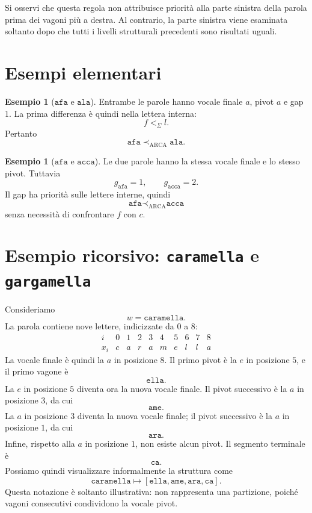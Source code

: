 \documentclass[11pt,a4paper]{article}
\theoremstyle{definition}
\newtheorem{esempio}[teorema]{Esempio}
\theoremstyle{remark}
\newcommand{\ARCA}{\mathrm{ARCA}}
\newcommand{\precA}{\prec_{\ARCA}}
\begin{document}
Si osservi che questa regola non attribuisce priorità alla parte sinistra della parola prima dei vagoni più a destra. Al contrario, la parte sinistra viene esaminata soltanto dopo che tutti i livelli strutturali precedenti sono risultati uguali.

\section{Esempi elementari}

\begin{esempio}[$\texttt{afa}$ e $\texttt{ala}$]
Entrambe le parole hanno vocale finale $a$, pivot $a$ e gap $1$. La prima differenza è quindi nella lettera interna:
\[
  f<_{\Sigma}l.
\]
Pertanto
\[
  \texttt{afa}\precA\texttt{ala}.
\]
\end{esempio}

\begin{esempio}[$\texttt{afa}$ e $\texttt{acca}$]
Le due parole hanno la stessa vocale finale e lo stesso pivot. Tuttavia
\[
  g_{\texttt{afa}}=1,\qquad g_{\texttt{acca}}=2.
\]
Il gap ha priorità sulle lettere interne, quindi
\[
  \texttt{afa}\precA\texttt{acca}
\]
senza necessità di confrontare $f$ con $c$.
\end{esempio}

\section{Esempio ricorsivo: \texttt{caramella} e \texttt{gargamella}}

Consideriamo
\[
  w=\texttt{caramella}.
\]
La parola contiene nove lettere, indicizzate da $0$ a $8$:
\[
\begin{array}{c|ccccccccc}
 i   &0&1&2&3&4&5&6&7&8\\
\hline
 x_i &c&a&r&a&m&e&l&l&a
\end{array}
\]
La vocale finale è quindi la $a$ in posizione $8$. Il primo pivot è la $e$ in posizione $5$, e il primo vagone è
\[
  \boxed{\texttt{ella}}.
\]
La $e$ in posizione $5$ diventa ora la nuova vocale finale. Il pivot successivo è la $a$ in posizione $3$, da cui
\[
  \boxed{\texttt{ame}}.
\]
La $a$ in posizione $3$ diventa la nuova vocale finale; il pivot successivo è la $a$ in posizione $1$, da cui
\[
  \boxed{\texttt{ara}}.
\]
Infine, rispetto alla $a$ in posizione $1$, non esiste alcun pivot. Il segmento terminale è
\[
  \boxed{\texttt{ca}}.
\]
Possiamo quindi visualizzare informalmente la struttura come
\[
  \texttt{caramella}\longmapsto
  [\texttt{ella},\texttt{ame},\texttt{ara},\texttt{ca}].
\]
Questa notazione è soltanto illustrativa: non rappresenta una partizione, poiché vagoni consecutivi condividono la vocale pivot.
\end{document}

